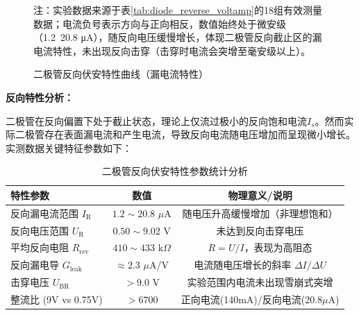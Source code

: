 \documentclass[11pt]{article}
\begin{document}
\begin{figure}[htbp]
  \caption{二极管反向伏安特性曲线（漏电流特性）}
  \label{fig:diode_reverse_voltamp_curve}
  \footnotesize{注：实验数据来源于表\ref{tab:diode_reverse_voltamp}的18组有效测量数据；电流负号表示方向与正向相反，数值始终处于微安级（1.2~20.8 μA），随反向电压缓慢增长，体现二极管反向截止区的漏电流特性，未出现反向击穿（击穿时电流会突增至毫安级以上）。}
\end{figure}

\noindent\textbf{反向特性分析：}

二极管在反向偏置下处于截止状态，理论上仅流过极小的反向饱和电流$I_s$。然而实际二极管存在表面漏电流和产生电流，导致反向电流随电压增加而呈现微小增长。实测数据关键特征参数如下：

\begin{table}[H]
  \centering
  \small
  \begin{tabular}{lcc}
    \toprule
    \textbf{特性参数} & \textbf{数值} & \textbf{物理意义/说明} \\
    \midrule
    反向漏电流范围 $I_{\text{R}}$ & $1.2\sim20.8$ $\mu$A & 随电压升高缓慢增加（非理想饱和） \\
    反向电压范围 $U_{\text{R}}$ & $0.50\sim9.02$ V & 未达到反向击穿电压 \\
    平均反向电阻 $R_{\text{rev}}$ & $410\sim433$ k$\Omega$ & $R = U/I$，表现为高阻态 \\
    反向漏电导 $G_{\text{leak}}$ & $\approx 2.3$ $\mu$A/V & 电流随电压增长的斜率 $\Delta I/\Delta U$ \\
    击穿电压 $U_{\text{BR}}$ & $> 9.0$ V & 实验范围内电流未出现雪崩式突增 \\
    整流比 (9V vs 0.75V) & $> 6700$ & 正向电流(140mA)/反向电流(20.8$\mu$A) \\
    \bottomrule
  \end{tabular}
  \caption{二极管反向伏安特性参数统计分析}
  \label{tab:diode_reverse_stats}
\end{table}
\end{document}
